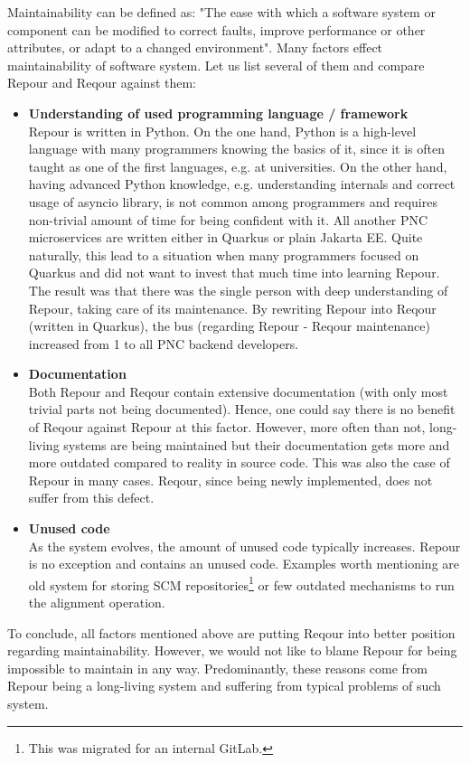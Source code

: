 \documentclass[../main.tex]{subfiles}
\begin{document}
Maintainability can be defined as: "The ease with which a software system or component can be modified to correct faults, improve performance
or other attributes, or adapt to a changed environment"\cite{software-glossary}. Many factors effect maintainability of software system. Let us list several of them and compare Repour and Reqour against them:
\begin{itemize}
    \item \textbf{Understanding of used programming language / framework}\\
    Repour is written in Python. On the one hand, Python is a high-level language with many programmers knowing the basics of it, since it is often taught as one of the first languages, e.g. at universities. On the other hand, having advanced Python knowledge, e.g. understanding internals and correct usage of asyncio library, is not common among programmers and requires non-trivial amount of time for being confident with it. All another PNC microservices are written either in Quarkus or plain Jakarta EE. Quite naturally, this lead to a situation when many programmers focused on Quarkus and did not want to invest that much time into learning Repour. The result was that there was the single person with deep understanding of Repour, taking care of its maintenance. By rewriting Repour into Reqour (written in Quarkus), the bus (regarding Repour - Reqour maintenance) increased from 1 to all PNC backend developers.

    \item \textbf{Documentation}\\
    Both Repour and Reqour contain extensive documentation (with only most trivial parts not being documented). Hence, one could say there is no benefit of Reqour against Repour at this factor. However, more often than not, long-living systems are being maintained but their documentation gets more and more outdated compared to reality in source code. This was also the case of Repour in many cases. Reqour, since being newly implemented, does not suffer from this defect.

    \item \textbf{Unused code}\\
    As the system evolves, the amount of unused code typically increases. Repour is no exception and contains an unused code. Examples worth mentioning are old system for storing SCM repositories\footnote{This was migrated for an internal GitLab.} or few outdated mechanisms to run the alignment operation.
\end{itemize}

To conclude, all factors mentioned above are putting Reqour into better position regarding maintainability. However, we would not like to blame Repour for being impossible to maintain in any way. Predominantly, these reasons come from Repour being a long-living system and suffering from typical problems of such system.
\end{document}
